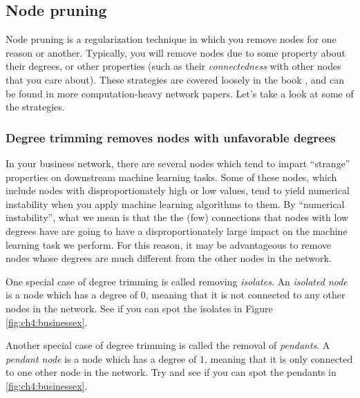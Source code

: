 \subsection{Node pruning}

Node pruning is a regularization technique in which you remove nodes for one reason or another. Typically, you will remove nodes due to some property about their degrees, or other properties (such as their \emph{connectedness} with other nodes that you care about). These strategies are covered loosely in the book \cite{Barabsi2013Mar}, and can be found in more computation-heavy network papers. Let's take a look at some of the strategies.

\subsubsection{Degree trimming removes nodes with unfavorable degrees}

In your business network, there are several nodes which tend to impart ``strange'' properties on downstream machine learning tasks. Some of these nodes, which include nodes with disproportionately high or low values, tend to yield numerical instability when you apply machine learning algorithms to them. By ``numerical instability'', what we mean is that the the (few) connections that nodes with low degrees have are going to have a disproportionately large impact on the machine learning task we perform. For this reason, it may be advantageous to remove nodes whose degrees are much different from the other nodes in the network. 

One special case of degree trimming is called removing \emph{isolates}. An \textit{isolated node} is a node which has a degree of $0$, meaning that it is not connected to any other nodes in the network. See if you can spot the isolates in Figure \ref{fig:ch4:businessex}.

Another special case of degree trimming is called the removal of \emph{pendants}. A \textit{pendant node} is a node which has a degree of $1$, meaning that it is only connected to one other node in the network. Try and see if you can spot the pendants in \ref{fig:ch4:businessex}.

